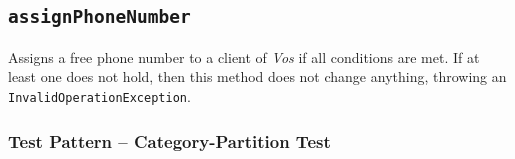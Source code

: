 %
%
%
\subsection{\texttt{assignPhoneNumber}}
\label{sec:methods.assignPhoneNumber}
Assigns a free phone number to a client of \textit{Vos} if all conditions are
met. If at least one does not hold, then this method does not change anything,
throwing an \texttt{InvalidOperationException}.

\subsubsection{Test Pattern -- Category-Partition Test}
\label{sec:methods.assignPhoneNumber.pattern}


